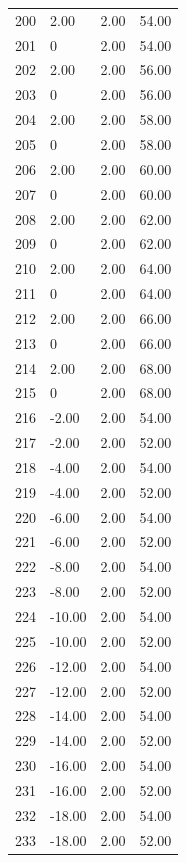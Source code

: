 \documentclass[a4paper,11pt]{article}
\begin{document}
\begin{center}
\begin{longtable}{|R{1.5cm}|R{2.4cm}|R{2.4cm}|R{2.4cm}|}
  200 &   2.00  &   2.00  &  54.00 \\ 
  201 & 0  &   2.00  &  54.00 \\ 
  202 &   2.00  &   2.00  &  56.00 \\ 
  203 & 0  &   2.00  &  56.00 \\ 
  204 &   2.00  &   2.00  &  58.00 \\ 
  205 & 0  &   2.00  &  58.00 \\ 
  206 &   2.00  &   2.00  &  60.00 \\ 
  207 & 0  &   2.00  &  60.00 \\ 
  208 &   2.00  &   2.00  &  62.00 \\ 
  209 & 0  &   2.00  &  62.00 \\ 
  210 &   2.00  &   2.00  &  64.00 \\ 
  211 & 0  &   2.00  &  64.00 \\ 
  212 &   2.00  &   2.00  &  66.00 \\ 
  213 & 0  &   2.00  &  66.00 \\ 
  214 &   2.00  &   2.00  &  68.00 \\ 
  215 & 0  &   2.00  &  68.00 \\ 
  216 &  -2.00  &   2.00  &  54.00 \\ 
  217 &  -2.00  &   2.00  &  52.00 \\ 
  218 &  -4.00  &   2.00  &  54.00 \\ 
  219 &  -4.00  &   2.00  &  52.00 \\ 
  220 &  -6.00  &   2.00  &  54.00 \\ 
  221 &  -6.00  &   2.00  &  52.00 \\ 
  222 &  -8.00  &   2.00  &  54.00 \\ 
  223 &  -8.00  &   2.00  &  52.00 \\ 
  224 & -10.00  &   2.00  &  54.00 \\ 
  225 & -10.00  &   2.00  &  52.00 \\ 
  226 & -12.00  &   2.00  &  54.00 \\ 
  227 & -12.00  &   2.00  &  52.00 \\ 
  228 & -14.00  &   2.00  &  54.00 \\ 
  229 & -14.00  &   2.00  &  52.00 \\ 
  230 & -16.00  &   2.00  &  54.00 \\ 
  231 & -16.00  &   2.00  &  52.00 \\ 
  232 & -18.00  &   2.00  &  54.00 \\ 
  233 & -18.00  &   2.00  &  52.00 \\ 

\end{longtable}
\end{center}
\end{document}
